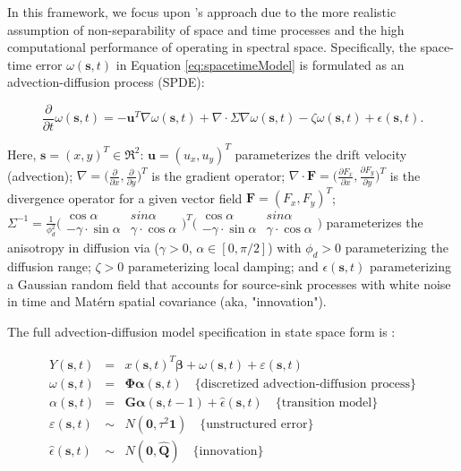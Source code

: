 \documentclass[letterpaper,portrait,11pt]{scrartcl}
\numberwithin{equation}{section}    %
\numberwithin{figure}{section}    %
\numberwithin{table}{section}       %
\begin{document}
In this framework, we focus upon \textcite{sigrist2015stochastic}'s approach due to the more realistic assumption of non-separability of space and time processes and the high computational performance of operating in spectral space. Specifically, the space-time error $\omega(\bm{s},t)$ in Equation \ref{eq:spacetimeModel} is formulated as an advection-diffusion process (SPDE):

\begin{equation}
\label{eq:adevectionDiffsionSPDE}
\frac{\partial}{\partial t} \omega(\bm{s},t) = - \bm{u}^T \nabla \omega(\bm{s},t)
+ \nabla \cdotp \Sigma \nabla \omega(\bm{s},t) - \zeta  \omega(\bm{s},t) + \epsilon(\bm{s},t).
\end{equation}

Here, $\bm{s}=(x,y)^T \in \Re^2$: $\bm{u}=(u_x, u_y)^T$ parameterizes the drift velocity (advection); $\nabla = \Big( \frac{\partial}{\partial x}, \frac{\partial}{\partial y} \Big)^T$  is the gradient operator;  $\nabla \cdotp \bm{F} = \Big( \frac{\partial F_x}{\partial x}, \frac{\partial F_y}{\partial y} \Big)^T$ is the divergence operator for a given vector field $\bm{F}=(F_x, F_y)^T$; $\Sigma^{-1} = \frac{1}{\phi^{2}_{d} }
  \Big(
  \begin{array}{cc}
  \cos \alpha & sin \alpha \\
  - \gamma \cdot \sin \alpha & \gamma \cdot \cos \alpha
  \end{array}
  \Big)^T
  \Big(
  \begin{array}{cc}
  \cos \alpha & sin \alpha \\
  - \gamma \cdot \sin \alpha & \gamma \cdot \cos \alpha
  \end{array}
  \Big) $ parameterizes the anisotropy in diffusion via ($\gamma > 0$, $\alpha \in [0,\pi/2]$) with $\phi_d > 0$  parameterizing the diffusion range; $\zeta > 0$ parameterizing local damping; and $\epsilon(\bm{s},t)$ parameterizing a Gaussian random field that accounts for source-sink processes with white noise in time and Mat\'{e}rn spatial covariance (aka, "innovation").


The full advection-diffusion model specification in state space form is  \parencite{sigrist2015stochastic}:

  \begin{eqnarray*}
    Y(\bm{s},t) &=& x(\bm{s},t)^{T} \bm{\beta} +  \omega(\bm{s},t) + \varepsilon(\bm{s},t) \\
    \omega(\bm{s},t) &=& \bm{\Phi} \bm{\alpha} (\bm{s},t)  \quad \text{\{discretized advection-diffusion process\}}\\
    \alpha (\bm{s},t)&=& \bm{G} \bm{\alpha} (\bm{s},t-1) + \hat{\epsilon}(\bm{s},t)  \quad \text{\{transition model\}} \\
    \varepsilon(\bm{s},t) &\sim& N(\bm{0}, \tau^2 \bm{1} ) \quad \text{\{unstructured error\}}\\
    \hat{\epsilon}(\bm{s},t) &\sim& N(\bm{0}, \bm{\hat{Q}})  \quad \text{\{innovation\}}\\
  \end{eqnarray*}
\end{document}
